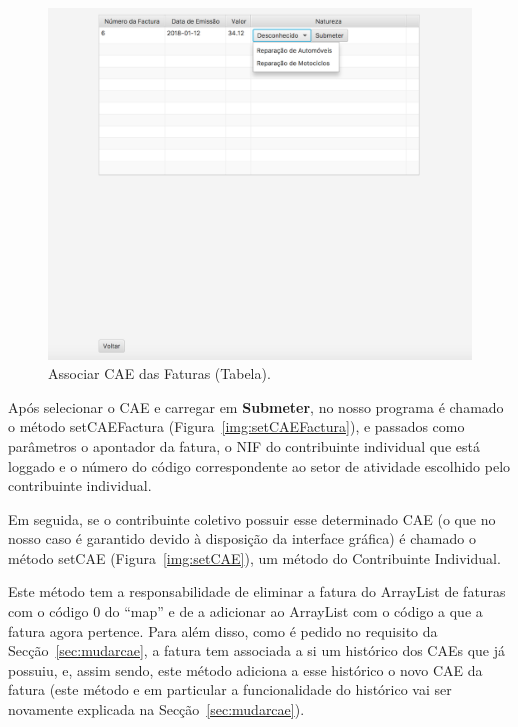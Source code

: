 \documentclass[a4paper]{article}
\begin{document}
\begin{itemize}
\begin{figure}[H]
\centering
\includegraphics[scale=0.35]{imgs/associarcaetable.png}
\caption{Associar CAE das Faturas (Tabela).}
\label{img:associarcaetable}
\end{figure}

Após selecionar o CAE e carregar em \textbf{Submeter}, no nosso programa
é chamado o método \textsf{setCAEFactura} (Figura~\ref{img:setCAEFactura}),
e passados como parâmetros o apontador da fatura, o NIF do contribuinte individual
que está loggado e o número do código correspondente ao setor de atividade escolhido
pelo contribuinte individual.

Em seguida, se o contribuinte coletivo possuir esse determinado CAE
(o que no nosso caso é garantido devido à disposição da interface gráfica)
é chamado o método \textsf{setCAE} (Figura~\ref{img:setCAE}),
um método do Contribuinte Individual.

Este método tem a responsabilidade de eliminar a fatura do ArrayList de faturas
com o código 0 do ``map'' e de a adicionar ao ArrayList com o código a que a fatura
agora pertence. Para além disso, como é pedido no requisito da Secção~\ref{sec:mudarcae},
a fatura tem associada a si um histórico dos CAEs que já possuiu, e, assim sendo,
este método adiciona a esse histórico o novo CAE da fatura (este método e em particular
a funcionalidade do histórico vai ser novamente
explicada na Secção~\ref{sec:mudarcae}).




\end{itemize}
\end{document}
